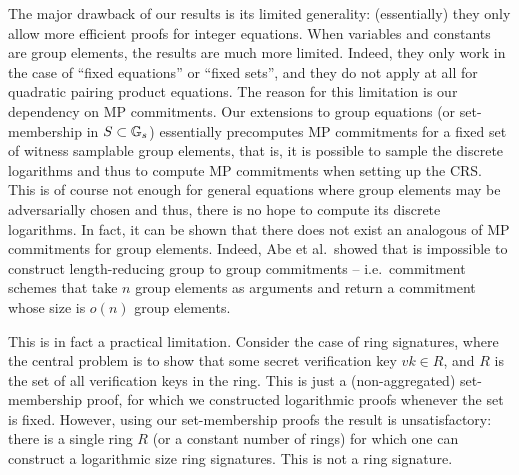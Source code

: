 The major drawback of our results is its limited generality: (essentially) they only allow more efficient proofs for integer equations. When variables and constants are group elements, the results are much more limited. Indeed, they only work in the case of ``fixed equations'' or ``fixed sets'', and they do not apply at all for quadratic pairing product equations. The reason for this limitation is our dependency on MP commitments. Our extensions to group equations (or set-membership in $S\subset\mathbb{G}_s$) essentially precomputes MP commitments for a fixed set of witness samplable group elements, that is, it is possible to sample the discrete logarithms and thus to compute MP commitments when setting up the CRS. This is of course not enough for general equations where group elements may be adversarially chosen and thus, there is no hope to compute its discrete logarithms. In fact, it can be shown that there does not exist an analogous of MP commitments for group elements. Indeed, Abe et al.~showed that is impossible to construct length-reducing group to group commitments \cite{EC:AbeHarOhk12} -- i.e.~commitment schemes that take $n$ group elements as arguments and return a commitment whose size is $o(n)$ group elements. 

This is in fact a practical limitation. Consider the case of ring signatures, where the central problem is to show that some secret verification key $vk\in R$, and $R$ is the set of all verification keys in the ring. This is just a (non-aggregated) set-membership proof, for which we constructed logarithmic proofs whenever the set is fixed. However, using our set-membership proofs the result is unsatisfactory: there is a single ring $R$ (or a constant number of rings) for which one can construct a logarithmic size ring signatures. This is not a ring signature.


